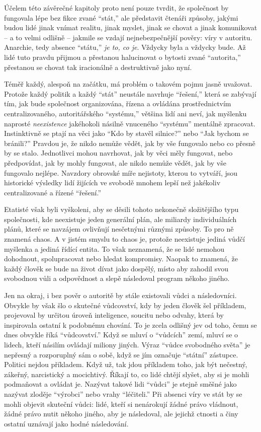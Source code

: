 \documentclass{book}
\begin{document}
Účelem této závěrečné kapitoly proto není pouze tvrdit, že společnost by fungovala lépe bez fikce zvané \enquote{stát,} ale představit čtenáři způsoby, jakými budou lidé jinak vnímat realitu, jinak myslet, jinak se chovat a jinak komunikovat -- a to velmi odlišně -- jakmile se vzdají nejnebezpečnější pověry: víry v autoritu. Anarchie, tedy absence \enquote{státu,} \emph{je to, co je}. Vždycky byla a vždycky bude. Až lidé tuto pravdu přijmou a přestanou halucinovat o bytosti zvané \enquote{autorita,} přestanou se chovat tak iracionálně a destruktivně jako nyní.

Téměř každý, alespoň na začátku, má problém o takovém pojmu jasně uvažovat. Protože každý politik a každý \enquote{stát} neustále navrhuje \enquote{řešení,} která se zabývají tím, jak bude společnost organizována, řízena a ovládána prostřednictvím centralizovaného, autoritářského \enquote{systému,} většina lidí ani neví, jak myšlenku naprosté \emph{neexistence} jakéhokoli násilně vnuceného \enquote{systému} mentálně zpracovat. Instinktivně se ptají na věci jako \enquote{Kdo by stavěl silnice?} nebo \enquote{Jak bychom se bránili?} Pravdou je, že nikdo nemůže vědět, jak by vše fungovalo nebo co přesně by se stalo. Jednotlivci mohou navrhovat, jak by věci měly fungovat, nebo předpovídat, jak by mohly fungovat, ale nikdo nemůže vědět, jak by vše fungovalo nejlépe. Navzdory obrovské míře nejistoty, kterou to vytváří, jsou historické výsledky lidí žijících ve svobodě mnohem lepší než jakékoliv centralizované a řízené \enquote{řešení.}

Etatisté však byli vyškoleni, aby se děsili tohoto nekonečně složitějšího typu společnosti, kde neexistuje jeden generální plán, ale miliardy individuálních plánů, které se navzájem ovlivňují nesčetnými různými způsoby. To pro ně znamená chaos. A v jistém smyslu to chaos je, protože neexistuje jediná vůdčí myšlenka a jediná řídící entita. To však neznamená, že se lidé nemohou dohodnout, spolupracovat nebo hledat kompromisy. Naopak to znamená, že každý člověk se bude na život dívat jako dospělý, místo aby zahodil svou svobodnou vůli a odpovědnost a slepě následoval program někoho jiného.

Jen na okraj, i bez pověr o autoritě by stále existovali vůdci a následovníci. Obvykle by však šlo o skutečné vůdcovství, kdy by jeden člověk šel příkladem, projevoval by určitou úroveň inteligence, soucitu nebo odvahy, která by inspirovala ostatní k podobnému chování. To je zcela odlišný jev od toho, čemu se dnes obvykle říká \enquote{vůdcovství.} Když se mluví o \enquote{vůdcích} zemí, mluví se o lidech, kteří násilím ovládají miliony jiných. Výraz \enquote{vůdce svobodného světa} je nepřesný a rozporuplný sám o sobě, když se jím označuje \enquote{státní} zástupce. Politici nejdou příkladem. Když už, tak jdou příkladem toho, jak být nečestný, zákeřný, narcistický a mocichtivý. Říkají to, co lidé chtějí slyšet, aby si je mohli podmaňovat a ovládat je. Nazývat takové lidi \enquote{vůdci} je stejně směšné jako nazývat zloděje \enquote{výrobci} nebo vrahy \enquote{léčiteli.} Při absenci víry ve stát by se mohli objevit skuteční vůdci: lidé, kteří si nenárokují žádné právo vládnout, žádné právo nutit někoho jiného, aby je následoval, ale jejichž ctnosti a činy ostatní uznávají jako hodné následování.
\end{document}
